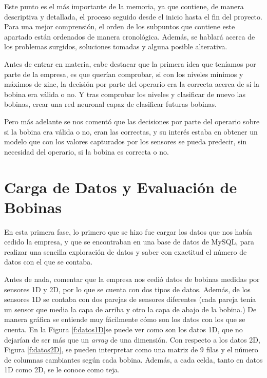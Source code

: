 
Este punto es el más importante de la memoria, ya que contiene, de manera descriptiva y detallada, el proceso seguido desde el inicio hasta el fin del proyecto. Para una mejor comprensión, el orden de los subpuntos que contiene este apartado están ordenados de manera cronológica. Además, se hablará acerca de los problemas surgidos, soluciones tomadas y alguna posible alterativa. 

Antes de entrar en materia, cabe destacar que la primera idea que teníamos por parte de la empresa, es que querían comprobar, si con los niveles mínimos y máximos de zinc, la decisión por parte del operario era la correcta acerca de si la bobina era válida o no. Y tras comprobar los niveles y clasificar de nuevo las bobinas, crear una red neuronal capaz de clasificar futuras bobinas.

Pero más adelante se nos comentó que las decisiones por parte del operario sobre si la bobina era válida o no, eran las correctas, y su interés estaba en obtener un modelo que con los valores capturados por los sensores se pueda predecir, sin necesidad del operario, si la bobina es correcta o no.

\section{Carga de Datos y Evaluación de Bobinas}
En esta primera fase, lo primero que se hizo fue cargar los datos que nos había cedido la empresa, y que se encontraban en una base de datos de MySQL, para realizar una sencilla exploración de datos y saber con exactitud el número de datos con el que se contaba.

Antes de nada, comentar que la empresa nos cedió datos de bobinas medidas por sensores 1D y 2D, por lo que se cuenta con dos tipos de datos. Además, de los sensores 1D se contaba con dos parejas de sensores diferentes (cada pareja tenía un sensor que media la capa de arriba y otro la capa de abajo de la bobina.) De manera gráfica se entiende muy fácilmente cómo son los datos con los que se cuenta. En la Figura \ref{f:datos1D}se puede ver como son los datos 1D, que no dejarían de ser más que un \emph{array} de una dimensión. Con respecto a los datos 2D, Figura \ref{f:datos2D}, se pueden interpretar como una matriz de 9 filas y el número de columnas cambiantes según cada bobina. Además, a cada celda, tanto en datos 1D como 2D, se le conoce como teja.

